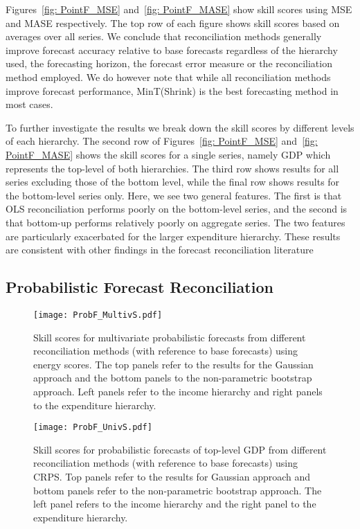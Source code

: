 {Figures~\ref{fig: PointF_MSE} and~\ref{fig: PointF_MASE} show skill scores using MSE and MASE respectively. The top row of each figure shows skill scores based on averages over all series. We conclude that reconciliation methods generally improve forecast accuracy relative to base forecasts regardless of the hierarchy used, the forecasting horizon, the forecast error measure or the reconciliation method employed. We do however note that while all reconciliation methods improve forecast performance, MinT(Shrink) is the best forecasting method in most cases.

To further investigate the results we break down the skill scores by different levels of each hierarchy. The second row of Figures~\ref{fig: PointF_MSE} and~\ref{fig: PointF_MASE} shows the skill scores for a single series, namely GDP which represents the top-level of both hierarchies. The third row shows results for all series excluding those of the bottom level, while the final row shows results for the bottom-level series only. Here, we see two general features. The first is that OLS reconciliation performs poorly on the bottom-level series, and the second is that bottom-up performs relatively poorly on aggregate series. The two features are particularly exacerbated for the larger expenditure hierarchy. These results are consistent with other findings in the forecast reconciliation literature \citep[see for instance][]{AthEtAl2017,WicEtAl2019}

\subsection{Probabilistic Forecast Reconciliation}

\begin{figure}[!b]
	\centering
	\small
	\texttt{[image: ProbF\_MultivS.pdf]}
	\caption{Skill scores for multivariate probabilistic forecasts from different reconciliation methods (with reference to base forecasts) using energy scores. The top panels refer to the results for the Gaussian approach and the bottom panels to the non-parametric bootstrap approach. Left panels refer to the income hierarchy and right panels to the expenditure hierarchy.}
	\label{fig: Prob-forecasts-SS_ES}
\end{figure}

\begin{figure}
	\centering
	\small
	\texttt{[image: ProbF\_UnivS.pdf]}
	\caption{Skill scores for probabilistic forecasts of top-level GDP from different reconciliation methods (with reference to base forecasts) using CRPS. Top panels refer to the results for Gaussian approach and bottom panels refer to the non-parametric bootstrap approach. The left panel refers to the income hierarchy and the right panel to the expenditure hierarchy.}
	\label{fig: Prob-forecasts-SS_CRPS}
\end{figure}

}
